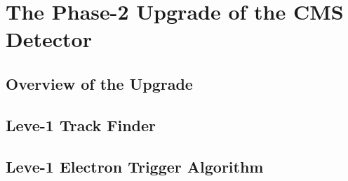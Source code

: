 \chapter{The Phase-2 Upgrade of the CMS Detector}

\section{Overview of the Upgrade}

\section{Leve-1 Track Finder}

\section{Leve-1 Electron Trigger Algorithm}
